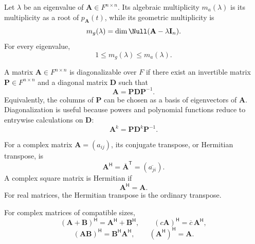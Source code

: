     \begin{definition}
        Let $\lambda$ be an eigenvalue of $\mathbf{A}\in F^{n\times n}$.
        Its algebraic multiplicity $m_a(\lambda)$ is its multiplicity as a root
        of $p_{\mathbf{A}}(t)$, while its geometric multiplicity is
        \[
            m_g(\lambda)
            =
            \dim\Null(\mathbf{A}-\lambda\mathbf{I}_n).
        \]
        For every eigenvalue,
        \[
            1\leq m_g(\lambda)\leq m_a(\lambda).
        \]
    \end{definition}

    \begin{definition}
        A matrix $\mathbf{A}\in F^{n\times n}$ is diagonalizable over $F$ if
        there exist an invertible matrix $\mathbf{P}\in F^{n\times n}$ and a
        diagonal matrix $\mathbf{D}$ such that
        \[
            \mathbf{A}=\mathbf{P}\mathbf{D}\mathbf{P}^{-1}.
        \]
        Equivalently, the columns of $\mathbf{P}$ can be chosen as a basis of
        eigenvectors of $\mathbf{A}$. Diagonalization is useful because powers
        and polynomial functions reduce to entrywise calculations on
        $\mathbf{D}$:
        \[
            \mathbf{A}^k=\mathbf{P}\mathbf{D}^k\mathbf{P}^{-1}.
        \]
    \end{definition}

    \begin{definition}
        For a complex matrix $\mathbf{A}=(a_{ij})$, its conjugate transpose, or
        Hermitian transpose, is
        \[
            \mathbf{A}^{\mathsf H}
            =
            \overline{\mathbf{A}}^{\mathsf T}
            =
            (\overline{a_{ji}}).
        \]
        A complex square matrix is Hermitian if
        \[
            \mathbf{A}^{\mathsf H}=\mathbf{A}.
        \]
        For real matrices, the Hermitian transpose is the ordinary transpose.
    \end{definition}

    \begin{proposition}
        For complex matrices of compatible sizes,
        \[
            (\mathbf{A}+\mathbf{B})^{\mathsf H}
            =
            \mathbf{A}^{\mathsf H}+\mathbf{B}^{\mathsf H},
            \qquad
            (c\mathbf{A})^{\mathsf H}
            =
            \overline{c}\,\mathbf{A}^{\mathsf H},
        \]
        \[
            (\mathbf{A}\mathbf{B})^{\mathsf H}
            =
            \mathbf{B}^{\mathsf H}\mathbf{A}^{\mathsf H},
            \qquad
            (\mathbf{A}^{\mathsf H})^{\mathsf H}
            =
            \mathbf{A}.
        \]
    \end{proposition}


